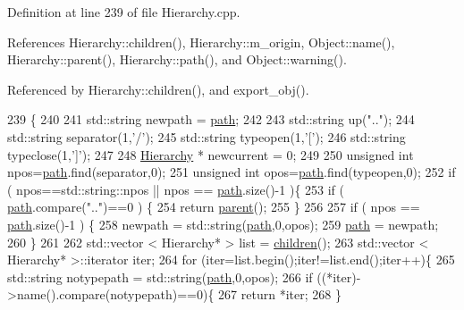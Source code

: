 Definition at line 239 of file Hierarchy.\+cpp.



References Hierarchy\+::children(), Hierarchy\+::m\+\_\+origin, Object\+::name(), Hierarchy\+::parent(), Hierarchy\+::path(), and Object\+::warning().



Referenced by Hierarchy\+::children(), and export\+\_\+obj().


\begin{DoxyCode}
239                                               \{
240 
241   std::string newpath = \hyperlink{classHierarchy_aa7990fa7caf132d83e361ce033c6c65a}{path};
242 
243   std::string up(\textcolor{stringliteral}{".."});
244   std::string separator(1,\textcolor{charliteral}{'/'});
245   std::string typeopen(1,\textcolor{charliteral}{'['});
246   std::string typeclose(1,\textcolor{charliteral}{']'});
247 
248   \hyperlink{classHierarchy}{Hierarchy} * newcurrent = 0;
249 
250   \textcolor{keywordtype}{unsigned} \textcolor{keywordtype}{int} npos=\hyperlink{classHierarchy_aa7990fa7caf132d83e361ce033c6c65a}{path}.find(separator,0);
251   \textcolor{keywordtype}{unsigned} \textcolor{keywordtype}{int} opos=\hyperlink{classHierarchy_aa7990fa7caf132d83e361ce033c6c65a}{path}.find(typeopen,0);
252   \textcolor{keywordflow}{if} ( npos==std::string::npos || npos == \hyperlink{classHierarchy_aa7990fa7caf132d83e361ce033c6c65a}{path}.size()-1 )\{
253     \textcolor{keywordflow}{if} ( \hyperlink{classHierarchy_aa7990fa7caf132d83e361ce033c6c65a}{path}.compare(\textcolor{stringliteral}{".."})==0 ) \{
254       \textcolor{keywordflow}{return} \hyperlink{classHierarchy_a1c7bec8257e717f9c1465e06ebf845fc}{parent}();
255     \}
256 
257     \textcolor{keywordflow}{if} ( npos == \hyperlink{classHierarchy_aa7990fa7caf132d83e361ce033c6c65a}{path}.size()-1 ) \{
258       newpath = std::string(\hyperlink{classHierarchy_aa7990fa7caf132d83e361ce033c6c65a}{path},0,opos);
259       \hyperlink{classHierarchy_aa7990fa7caf132d83e361ce033c6c65a}{path} = newpath;
260     \}
261 
262     std::vector < Hierarchy* > list = \hyperlink{classHierarchy_aa9a76f69e98e052ee1a6e32cea006288}{children}();
263     std::vector < Hierarchy* >::iterator iter;
264     \textcolor{keywordflow}{for} (iter=list.begin();iter!=list.end();iter++)\{
265       std::string notypepath = std::string(\hyperlink{classHierarchy_aa7990fa7caf132d83e361ce033c6c65a}{path},0,opos);
266       \textcolor{keywordflow}{if} ((*iter)->name().compare(notypepath)==0)\{
267         \textcolor{keywordflow}{return} *iter;
268       \}

\end{DoxyCode}
